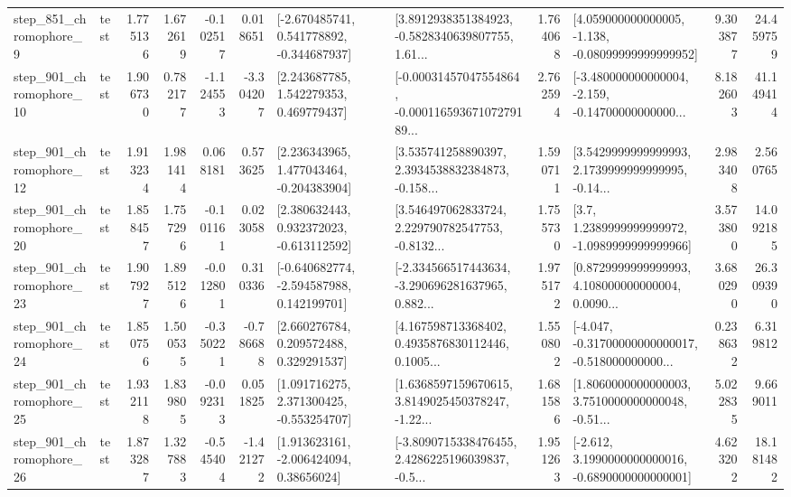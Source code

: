 \begin{tabular}{llrrrrllrlrr}
   step\_851\_chromophore\_9 &      test &      1.775136 &    1.672619 &     -0.102517 &  0.018651 &   [-2.670485741, 0.541778892, -0.344687937] &  [3.8912938351384923, -0.5828340639807755, 1.61... &       1.764068 &  [4.059000000000005, -1.138, -0.08099999999999952] &            9.303877 &         24.459759 \\
  step\_901\_chromophore\_10 &      test &      1.906730 &    0.782177 &     -1.124553 & -3.304207 &     [2.243687785, 1.542279353, 0.469779437] &  [-0.00031457047554864, -0.00011659367107279189... &       2.762594 &  [-3.480000000000004, -2.159, -0.14700000000000... &            8.182603 &         41.149414 \\
  step\_901\_chromophore\_12 &      test &      1.913234 &    1.981414 &      0.068181 &  0.573625 &    [2.236343965, 1.477043464, -0.204383904] &  [3.535741258890397, 2.3934538832384873, -0.158... &       1.590711 &  [3.5429999999999993, 2.1739999999999995, -0.14... &            2.983408 &          2.560765 \\
  step\_901\_chromophore\_20 &      test &      1.858457 &    1.757296 &     -0.101161 &  0.023058 &    [2.380632443, 0.932372023, -0.613112592] &  [3.546497062833724, 2.229790782547753, -0.8132... &       1.755730 &     [3.7, 1.2389999999999972, -1.0989999999999966] &            3.573800 &         14.092185 \\
  step\_901\_chromophore\_23 &      test &      1.907927 &    1.895126 &     -0.012801 &  0.310336 &   [-0.640682774, -2.594587988, 0.142199701] &  [-2.334566517443634, -3.290696281637965, 0.882... &       1.975172 &  [0.8729999999999993, 4.108000000000004, 0.0090... &            3.680290 &         26.309390 \\
  step\_901\_chromophore\_24 &      test &      1.850756 &    1.500535 &     -0.350221 & -0.786688 &     [2.660276784, 0.209572488, 0.329291537] &  [4.167598713368402, 0.4935876830112446, 0.1005... &       1.550802 &  [-4.047, -0.31700000000000017, -0.518000000000... &            0.238632 &          6.319812 \\
  step\_901\_chromophore\_25 &      test &      1.932118 &    1.839805 &     -0.092313 &  0.051825 &    [1.091716275, 2.371300425, -0.553254707] &  [1.6368597159670615, 3.8149025450378247, -1.22... &       1.681586 &  [1.8060000000000003, 3.7510000000000048, -0.51... &            5.022835 &          9.669011 \\
  step\_901\_chromophore\_26 &      test &      1.873287 &    1.327883 &     -0.545404 & -1.421272 &     [1.913623161, -2.006424094, 0.38656024] &  [-3.8090715338476455, 2.4286225196039837, -0.5... &       1.951263 &  [-2.612, 3.1990000000000016, -0.6890000000000001] &            4.623202 &         18.181482 \\

\end{tabular}
